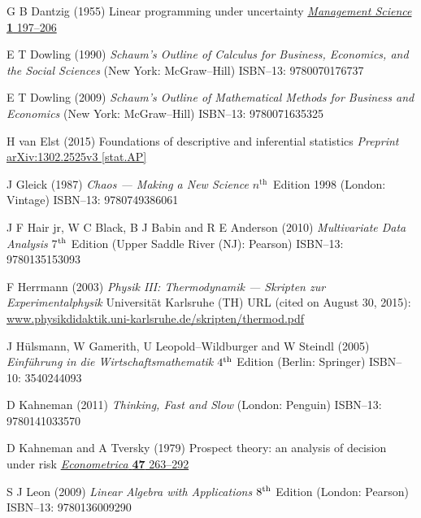 \begin{thebibliography}{99}
G B Dantzig
(1955) Linear programming under uncertainty
\href{http://dx.doi.org/10.1287/mnsc.1.3-4.197}{\emph{Management 
Science} {\bf 1} 197--206}

E T Dowling
(1990) \emph{Schaum's Outline of Calculus for Business, Economics, 
and the Social Sciences} (New York: McGraw--Hill) ISBN--13: 
9780070176737

E T Dowling
(2009) \emph{Schaum's Outline of Mathematical Methods for Business 
and Economics} (New York: McGraw--Hill) ISBN--13: 9780071635325

H van Elst
(2015) Foundations of descriptive and inferential statistics
\emph{Preprint} 
\href{http://arxiv.org/abs/1302.2525}{arXiv:1302.2525v3 [stat.AP]}

J Gleick
(1987) \emph{Chaos --- Making a New Science}
$n^{\text{th}}$~Edition 1998 (London: Vintage)
ISBN--13: 9780749386061


J F Hair jr, W C Black, B J Babin and R E Anderson
(2010) \emph{Multivariate Data Analysis} 7$^{\rm th}$ Edition 
(Upper Saddle River (NJ): Pearson) ISBN--13: 9780135153093

F Herrmann
(2003) 
\emph{Physik III: Thermodynamik --- Skripten zur 
Experimentalphysik} Universit\"at Karlsruhe (TH) 
URL (cited on August 30, 2015): \\
\href{http://www.physikdidaktik.uni-karlsruhe.de/skripten/thermod.pdf}{www.physikdidaktik.uni-karlsruhe.de/skripten/thermod.pdf}

J H\"ulsmann, W Gamerith, U Leopold--Wildburger and W Steindl
(2005) \emph{Einf\"uhrung in die Wirtschaftsmathematik}
$4^{\rm th}$ Edition (Berlin: Springer) ISBN--10: 3540244093

D Kahneman
(2011) \emph{Thinking, Fast and Slow} (London: Penguin)
ISBN--13: 9780141033570

D Kahneman and A Tversky
(1979) Prospect theory: an analysis of decision under risk 
\href{http://www.jstor.org/stable/1914185}{\emph{Econometrica} 
{\bf 47} 263--292}

S J Leon
(2009) \emph{Linear Algebra with Applications}
$8^{\rm th}$ Edition (London: Pearson) ISBN--13: 9780136009290


\end{thebibliography}
